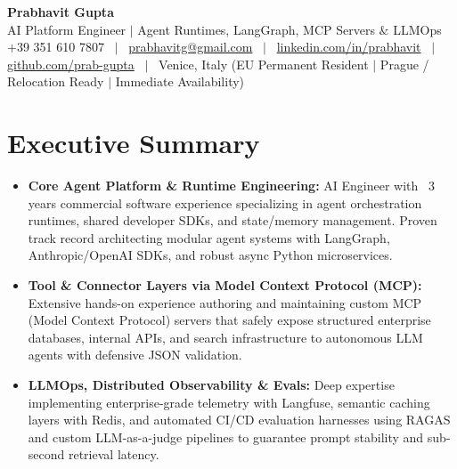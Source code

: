 \documentclass[a4paper,10pt]{article}
\begin{document}
\begin{minipage}[c]{0.80\textwidth}
  {\Huge\bfseries Prabhavit Gupta}\\[3pt]
  {\color{accent}\large AI Platform Engineer $\vert$ Agent Runtimes, LangGraph, MCP Servers $\&$ LLMOps}\\[6pt]
  {\footnotesize +39 351 610 7807 ~$\vert$~
  \href{mailto:prabhavitg@gmail.com}{prabhavitg@gmail.com} ~$\vert$~
  \href{https://www.linkedin.com/in/prabhavit/}{linkedin.com/in/prabhavit} ~$\vert$~
  \href{https://github.com/prab-gupta}{github.com/prab-gupta} ~$\vert$~
  Venice, Italy (EU Permanent Resident $\vert$ Prague / Relocation Ready $\vert$ Immediate Availability)}
\end{minipage}\hfill

\vspace{6pt}

\section{Executive Summary}
\begin{itemize}
  \item \textbf{Core Agent Platform \& Runtime Engineering:} AI Engineer with ~3 years commercial software experience specializing in agent orchestration runtimes, shared developer SDKs, and state/memory management. Proven track record architecting modular agent systems with LangGraph, Anthropic/OpenAI SDKs, and robust async Python microservices.
  \item \textbf{Tool \& Connector Layers via Model Context Protocol (MCP):} Extensive hands-on experience authoring and maintaining custom MCP (Model Context Protocol) servers that safely expose structured enterprise databases, internal APIs, and search infrastructure to autonomous LLM agents with defensive JSON validation.
  \item \textbf{LLMOps, Distributed Observability \& Evals:} Deep expertise implementing enterprise-grade telemetry with Langfuse, semantic caching layers with Redis, and automated CI/CD evaluation harnesses using RAGAS and custom LLM-as-a-judge pipelines to guarantee prompt stability and sub-second retrieval latency.
\end{itemize}

\end{document}
